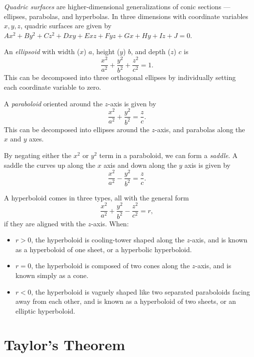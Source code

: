 \begin{defn}
    \emph{Quadric surfaces} are higher-dimensional generalizations of conic sections --- ellipses, parabolas, and hyperbolas. In three dimensions with coordinate variables $x, y, z$, quadric surfaces are given by $Ax^2 + By^2 + Cz^2 + Dxy + Exz + Fyz + Gx + Hy + Iz + J = 0$.
\end{defn}

\begin{defn}
    An \emph{ellipsoid} with width ($x$) $a$, height ($y$) $b$, and depth ($z$) $c$ is \[\frac{x^2}{a^2} + \frac{y^2}{b^2} + \frac{z^2}{c^2} = 1.\] This can be decomposed into three orthogonal ellipses by individually setting each coordinate variable to zero.
\end{defn}

\begin{defn}
    A \emph{paraboloid} oriented around the $z$-axis is given by \[\frac{x^2}{a^2} + \frac{y^2}{b^2} = \frac{z}{c}.\] This can be decomposed into ellipses around the $z$-axis, and parabolas along the $x$ and $y$ axes.
\end{defn}

\begin{defn}
    By negating either the $x^2$ or $y^2$ term in a paraboloid, we can form a \emph{saddle}. A saddle the curves up along the $x$ axis and down along the $y$ axis is given by \[\frac{x^2}{a^2} - \frac{y^2}{b^2} = \frac{z}{c}.\]
\end{defn}

\begin{defn}
    A hyperboloid comes in three types, all with the general form \[\frac{x^2}{a^2} + \frac{y^2}{b^2} - \frac{z^2}{c^2} = r,\] if they are aligned with the $z$-axis. When:
    \begin{itemize}
        \item $r > 0$, the hyperboloid is cooling-tower shaped along the $z$-axis, and is known as a hyperboloid of one sheet, or a hyperbolic hyperboloid.
        \item $r = 0$, the hyperboloid is composed of two cones along the $z$-axis, and is known simply as a cone.
        \item $r < 0$, the hyperboloid is vaguely shaped like two separated paraboloids facing away from each other, and is known as a hyperboloid of two sheets, or an elliptic hyperboloid.
    \end{itemize}
\end{defn}

\section{Taylor's Theorem}

